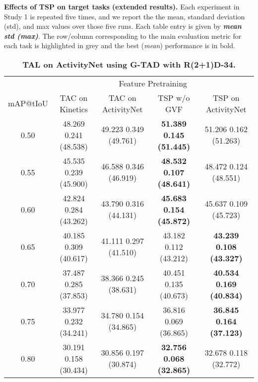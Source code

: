 \documentclass[10pt,twocolumn,letterpaper]{article}
\begin{document}
\begin{table*}[ht]
    \small
    \centering
    \caption{\textbf{Effects of TSP on target tasks (extended results).} Each experiment in Study 1 is repeated five times, and we report the the mean, standard deviation (std), and max values over those five runs. Each table entry is given by \textit{\textbf{mean  std (max)}}. The row/column corresponding to the main evaluation metric for each task is highlighted in grey and the best (\textit{mean}) performance is in bold.}
    \label{table:supp_mat_extended_ablation_study_1}
\begin{subtable}{\linewidth}
    \centering
    \caption{\bf TAL on ActivityNet using G-TAD with R(2+1)D-34.}
    \vspace{-5pt}
    \begin{tabular}{c|cccc}
    \toprule 
            & \multicolumn{4}{c}{Feature Pretraining} \\ 
    mAP@tIoU& TAC on Kinetics                           & TAC on ActivityNet                        & TSP w/o GVF                               & TSP on ActivityNet \\ \midrule
    0.50    & 48.269 {\scriptsize  0.241} (48.538) & 49.223 {\scriptsize  0.349} (49.761) & \bf 51.389 {\scriptsize  0.145} (51.445) & 51.206 {\scriptsize  0.162} (51.263) \\
    0.55    & 45.535 {\scriptsize  0.239} (45.900) & 46.588 {\scriptsize  0.346} (46.919) & \bf 48.532 {\scriptsize  0.107} (48.641) & 48.472 {\scriptsize  0.124} (48.551) \\
    0.60    & 42.824 {\scriptsize  0.284} (43.262) & 43.790 {\scriptsize  0.316} (44.131) & \bf 45.683 {\scriptsize  0.154} (45.872) & 45.637 {\scriptsize  0.109} (45.723) \\
    0.65    & 40.185 {\scriptsize  0.309} (40.617) & 41.111 {\scriptsize  0.297} (41.510) & 43.182 {\scriptsize  0.112} (43.212) & \bf 43.239 {\scriptsize  0.108} (43.327) \\
    0.70    & 37.487 {\scriptsize  0.285} (37.853) & 38.366 {\scriptsize  0.245} (38.631) & 40.451 {\scriptsize  0.135} (40.673) & \bf 40.534 {\scriptsize  0.169} (40.834) \\
    0.75    & 33.977 {\scriptsize  0.232} (34.241) & 34.780 {\scriptsize  0.154} (34.865) & 36.816 {\scriptsize  0.069} (36.865) & \bf 36.845 {\scriptsize  0.164} (37.123) \\
    0.80    & 30.191 {\scriptsize  0.158} (30.434) & 30.856 {\scriptsize  0.197} (30.874) & \bf 32.756 {\scriptsize  0.068} (32.865) & 32.678 {\scriptsize  0.118} (32.772) \\

\end{tabular}
\end{subtable}
\end{table*}
\end{document}
